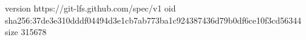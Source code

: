 version https://git-lfs.github.com/spec/v1
oid sha256:37de3e310dddf04494d3e1cb7ab773ba1c924387436d79b0df6ce10f3cd56344
size 315678
